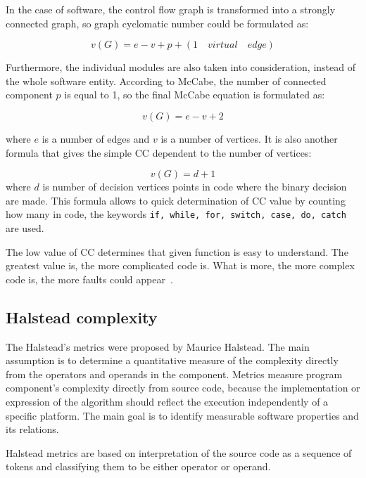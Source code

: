 In the case of software, the control flow graph is transformed into a strongly connected graph, so graph cyclomatic number could be formulated as:

\begin{equation}
v(G) = e - v + p + (1\quad virtual \quad edge)
\end{equation} 

Furthermore, the individual modules are also taken into consideration, instead of the whole software entity. According to McCabe, the number of connected component $p$ is equal to 1, so the final McCabe equation is formulated as:

\begin{equation}
v(G) = e - v + 2
\end{equation}

where $e$ is a number of edges and $v$ is a number of vertices. It is also another formula that gives the simple \ac{CC} dependent to the number of vertices:

\begin{equation}
v(G) = d + 1
\end{equation}
where $d$ is number of decision vertices points in code where the binary decision are made. This formula allows to quick determination of \ac{CC} value by counting how many in code, the keywords \texttt{if, while, for, switch, case, do, catch} are used. 

The low value of \ac{CC} determines that given function is easy to understand. The greatest value is, the more complicated code is. What is more, the more complex code is, the more faults could appear~\cite{alain}.

\subsection{Halstead complexity}
The Halstead's metrics were proposed by Maurice Halstead. The main assumption is to determine a quantitative measure of the complexity directly from the operators and operands in the component. Metrics measure program component's complexity directly from source code, because the implementation or expression of the algorithm should reflect the execution independently of a specific platform. The main goal is to identify measurable software properties and its relations.

Halstead metrics are based on interpretation of the source code as a sequence of tokens and classifying them to be either operator or operand.   

